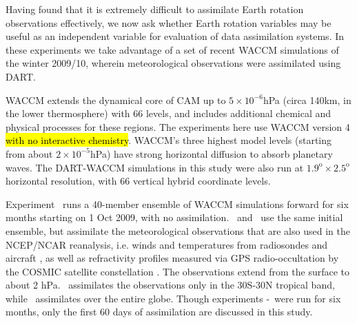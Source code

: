 Having found that it is extremely difficult to assimilate Earth rotation observations effectively, we now ask whether Earth rotation variables may be useful as an independent variable for evaluation of data assimilation systems. 
In these experiments we take advantage of a set of recent WACCM simulations of the winter 2009/10, wherein meteorological observations were assimilated using DART. 

WACCM \citep{Marsh2013} extends the dynamical core of CAM up to $5 \times 10^{-6}$hPa (circa 140km, in the lower thermosphere) with 66 levels, and includes additional chemical and physical processes for these regions. 
The experiments here use WACCM version 4 \hl{with no interactive chemistry}.
WACCM's three highest model levels (starting from about $2 \times 10^{-5}$hPa) have strong horizontal diffusion to absorb planetary waves. 
The DART-WACCM simulations in this study were also run at $1.9^{\text{o}} \times 2.5^{\text{o}}$ horizontal resolution, with 66 vertical hybrid coordinate levels. 


Experiment \WACCMNODA~runs a 40-member ensemble of WACCM simulations forward for six months starting on 1 Oct 2009, with no assimilation. 
\WACCMTROPICS~and \WACCMGLOBAL~use the same initial ensemble, but assimilate the meteorological observations that are also used in the NCEP/NCAR reanalysis, i.e. winds and temperatures from radiosondes and aircraft \citep{Saha2010}, as well as refractivity profiles measured via GPS radio-occultation by the COSMIC satellite constellation \citep{Anthes2008}.
The observations extend from the surface to about 2 hPa. 
\WACCMTROPICS~assimilates the observations only in the 30S-30N tropical band, while \WACCMGLOBAL~assimilates over the entire globe.
Though experiments \WACCMNODA-\WACCMGLOBAL~were run for six months, only the first 60 days of assimilation are discussed in this study.  

